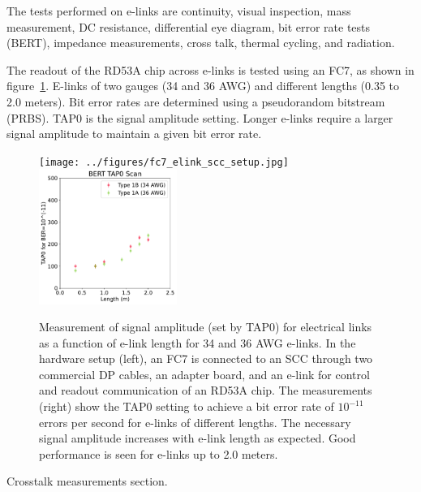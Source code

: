 \documentclass[a4paper,11pt]{article}
\begin{document}

The tests performed on e-links are continuity, visual inspection, mass measurement, DC resistance, differential eye diagram, bit error rate tests (BERT), impedance measurements, cross talk, thermal cycling, and radiation.


The readout of the RD53A chip across e-links is tested using an FC7, as shown in figure~\ref{fig:tap0_vs_length}.
E-links of two gauges (34 and 36 AWG) and different lengths (0.35 to 2.0 meters).
Bit error rates are determined using a pseudorandom bitstream (PRBS).
TAP0 is the signal amplitude setting.
Longer e-links require a larger signal amplitude to maintain a given bit error rate.

\begin{figure}[htbp]
\centering
\texttt{[image: ../figures/fc7\_elink\_scc\_setup.jpg]}
\qquad
\includegraphics[width=0.4\textwidth,origin=c]{../figures/BERT_TAP0_vs_Length.pdf}
\caption{
\label{fig:tap0_vs_length}
Measurement of signal amplitude (set by TAP0) for electrical links as a function of e-link length for 34 and 36 AWG e-links.
In the hardware setup (left), an FC7 is connected to an SCC through two commercial DP cables, an adapter board, and an e-link for control and readout communication of an RD53A chip.
The measurements (right) show the TAP0 setting to achieve a bit error rate of $10^{-11}$ errors per second for e-links of different lengths.
The necessary signal amplitude increases with e-link length as expected.
Good performance is seen for e-links up to 2.0 meters.
}
\end{figure}


Crosstalk measurements section.
\end{document}
